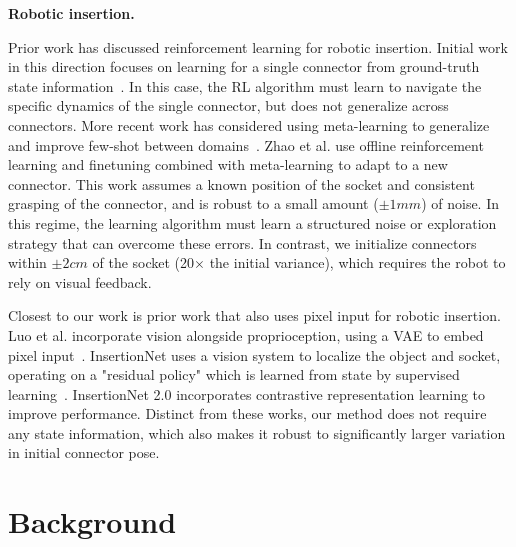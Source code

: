 \documentclass[letterpaper, 10 pt, conference, final]{ieeeconf}   %
\begin{document}
\textbf{Robotic insertion.}

Prior work has discussed reinforcement learning for robotic insertion.
Initial work in this direction focuses on learning
for a single connector from ground-truth state information~\cite{lian2021insertionbenchmark, johannink18residualrl, schoettler2019insertion}.
In this case, the RL algorithm must learn to navigate the specific dynamics of the single connector, but does not generalize across connectors.
More recent work has considered using meta-learning to generalize and improve few-shot between domains~\cite{Schoettler2020}.
Zhao et al.
use offline reinforcement learning and finetuning combined with  meta-learning to adapt to a new connector.
This work assumes a known position of the socket and consistent grasping of the connector, and is robust to a small amount ($\pm1mm$) of noise.
In this regime, the learning algorithm must learn a structured noise or exploration strategy that can overcome these errors.
In contrast, we initialize connectors within $\pm2cm$ of the socket (20$\times$ the initial variance), which requires the robot to rely on visual feedback.

Closest to our work is prior work that also uses pixel input for robotic insertion.
Luo et al. incorporate vision alongside proprioception, using a VAE to embed pixel input~\cite{luo2021insertion}.
InsertionNet uses a vision system to localize the object and socket, operating on a "residual policy" which is learned from state by supervised learning~\cite{spector2021insertionnet}.
InsertionNet 2.0 incorporates contrastive representation learning to improve performance.
Distinct from these works, our method does not require any state information, which also makes it robust to significantly larger variation in initial connector pose.

\section{Background}
\end{document}
